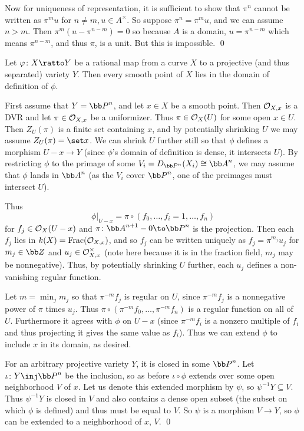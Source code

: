     Now for uniqueness of representation, it is sufficient to show that $\pi^n$ cannot be written as $\pi^mu$ for $n\neq m,u\in A^\times$.
    So suppose $\pi^n=\pi^mu$, and we can assume $n>m$.
    Then $\pi^m(u-\pi^{n-m})=0$ so because $A$ is a domain, $u=\pi^{n-m}$ which means $\pi^{n-m}$, and thus $\pi$, is a unit.
    But this is impossible.
    \qed

\eproof

\bprop

    Let $\phi\colon X\ratto Y$ be a rational map from a curve $X$ to a projective (and thus separated) variety $Y$.
    Then every smooth point of $X$ lies in the domain of definition of $\phi$.

\eprop

\bproof

    First assume that $Y=\bP^n$, and let $x\in X$ be a smooth point.
    Then ${{\cal O}}_{X,x}$ is a DVR and let $\pi\in{{\cal O}}_{X,x}$ be a uniformizer.
    Thus $\pi\in{{\cal O}}_X(U)$ for some open $x\in U$.
    Then $Z_U(\pi)$ is a finite set containing $x$, and by potentially shrinking $U$ we may assume $Z_U(\pi)=\set x$.
    We can shrink $U$ further still so that $\phi$ defines a morphism $U-x\to Y$ (since $\phi$'s domain of definition is dense, it intersects $U$).
    By restricting $\phi$ to the primage of some $V_i=D_{\bP^n}(X_i)\cong\bA^n$, we may assume that $\phi$ lands in $\bA^n$ (as the $V_i$ cover $\bP^n$, one of the preimages must intersect $U$).

    Thus
    $$ \phi|_{U-x} = \pi\circ(f_0,\dots,f_i=1,\dots,f_n) $$
    for $f_j\in{{\cal O}}_X(U-x)$ and $\pi\colon\bA^{n+1}-0\to\bP^n$ is the projection.
    Then each $f_j$ lies in $k(X)={\rm Frac}({{\cal O}}_{X,x})$, and so $f_j$ can be written uniquely as $f_j=\pi^{m_j}u_j$ for $m_j\in\bZ$ and $u_j\in{{\cal O}}_{X,x}^\times$ (note here because it is in the fraction field,
    $m_j$ may be nonnegative).
    Thus, by potentially shrinking $U$ further, each $u_j$ defines a non-vanishing regular function.

    Let $m=\min_jm_j$ so that $\pi^{-m}f_j$ is regular on $U$, since $\pi^{-m}f_j$ is a nonnegative power of $\pi$ times $u_j$.
    Thus $\pi\circ(\pi^{-m}f_0,\dots,\pi^{-m}f_n)$ is a regular function on all of $U$.
    Furthermore it agrees with $\phi$ on $U-x$ (since $\pi^{-m}f_i$ is a nonzero multiple of $f_i$ and thus projecting it gives the same value as $f_i$).
    Thus we can extend $\phi$ to include $x$ in its domain, as desired.

    For an arbitrary projective variety $Y$, it is closed in some $\bP^n$.
    Let $\iota\colon Y\inj\bP^n$ be the inclusion, so as before $\iota\circ\phi$ extends over some open neighborhood $V$ of $x$.
    Let us denote this extended morphism by $\psi$, so $\psi^{-1}Y\subseteq V$.
    Thus $\psi^{-1}Y$ is closed in $V$ and also contains a dense open subset (the subset on which $\phi$ is defined) and thus must be equal to $V$.
    So $\psi$ is a morphism $V\to Y$, so $\phi$ can be extended to a neighborhood of $x$, $V$.
    \qed

